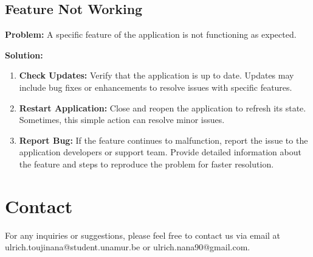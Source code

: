 \documentclass[12pt]{article}
\begin{document}
\subsection{Feature Not Working}

\textbf{Problem:} A specific feature of the application is not functioning as expected.

\textbf{Solution:}
\begin{enumerate}
    \item \textbf{Check Updates:} Verify that the application is up to date. Updates may include bug fixes or enhancements to resolve issues with specific features.
    \item \textbf{Restart Application:} Close and reopen the application to refresh its state. Sometimes, this simple action can resolve minor issues.
    \item \textbf{Report Bug:} If the feature continues to malfunction, report the issue to the application developers or support team. Provide detailed information about the feature and steps to reproduce the problem for faster resolution.
\end{enumerate}

\section{Contact}

For any inquiries or suggestions, please feel free to contact us via email at ulrich.toujinana@student.unamur.be or ulrich.nana90@gmail.com.
\end{document}
